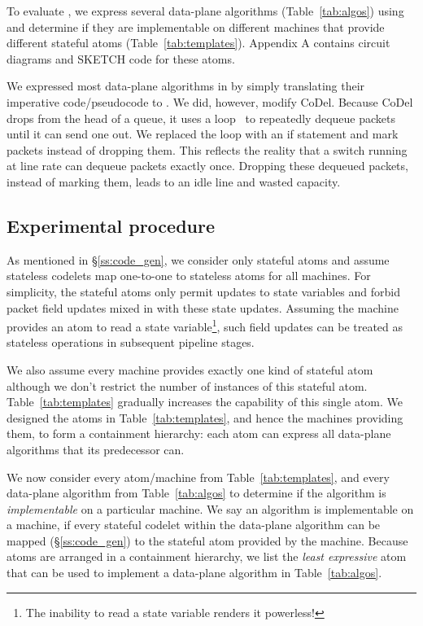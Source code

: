 To evaluate \pktlanguage, we express several data-plane algorithms
(Table~\ref{tab:algos}) using \pktlanguage and determine if they are
implementable on different \absmachine machines that provide different stateful
atoms (Table~\ref{tab:templates}). Appendix A contains circuit diagrams and
SKETCH code for these atoms.

We expressed most data-plane algorithms in \pktlanguage by simply translating
their imperative code/pseudocode to \pktlanguage. We did, however, modify
CoDel. Because CoDel drops from the head of a queue, it uses a
loop~\cite{codel_code} to repeatedly dequeue packets until it can send one out.
We replaced the loop with an if statement and mark packets instead of dropping
them. This reflects the reality that a switch running at line rate can dequeue
packets exactly once. Dropping these dequeued packets, instead of marking them,
leads to an idle line and wasted capacity.

\subsection{Experimental procedure}
As mentioned in \S\ref{ss:code_gen}, we consider only stateful atoms and assume
stateless codelets map one-to-one to stateless atoms for all \absmachine
machines. For simplicity, the stateful atoms only permit updates to state
variables and forbid packet field updates mixed in with these state updates.
Assuming the \absmachine machine provides an atom to read a state
variable\footnote{The inability to read a state variable renders it
powerless!}, such field updates can be treated as stateless operations in
subsequent pipeline stages.

We also assume every \absmachine machine provides exactly one kind of stateful
atom although we don't restrict the number of instances of this stateful atom.
Table~\ref{tab:templates} gradually increases the capability of this single
atom.  We designed the atoms in Table~\ref{tab:templates}, and hence the
\absmachine machines providing them, to form a containment hierarchy: each atom
can express all data-plane algorithms that its predecessor can.

We now consider every atom/\absmachine machine from Table~\ref{tab:templates},
and every data-plane algorithm from Table~\ref{tab:algos} to determine if the
algorithm is \textit{implementable} on a particular \absmachine machine. We say
an algorithm is implementable on a \absmachine machine, if every stateful
codelet within the data-plane algorithm can be mapped (\S\ref{ss:code_gen}) to
the stateful atom provided by the \absmachine machine. Because atoms are
arranged in a containment hierarchy, we list the \textit{least expressive} atom
that can be used to implement a data-plane algorithm in Table~\ref{tab:algos}.

